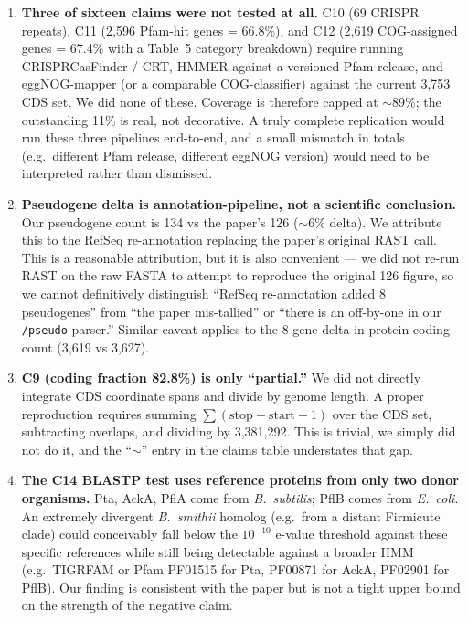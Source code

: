 \documentclass[11pt]{article}
\begin{document}
\begin{enumerate}

\item \textbf{Three of sixteen claims were not tested at all.}
C10 (69 CRISPR repeats), C11 (2{,}596 Pfam-hit genes = 66.8\%), and C12 (2{,}619 COG-assigned genes = 67.4\% with a Table~5 category breakdown) require running CRISPRCasFinder / CRT, HMMER against a versioned Pfam release, and eggNOG-mapper (or a comparable COG-classifier) against the current 3{,}753 CDS set. We did none of these. Coverage is therefore capped at $\sim$89\%; the outstanding 11\% is real, not decorative. A truly complete replication would run these three pipelines end-to-end, and a small mismatch in totals (e.g.\ different Pfam release, different eggNOG version) would need to be interpreted rather than dismissed.

\item \textbf{Pseudogene delta is annotation-pipeline, not a scientific conclusion.}
Our pseudogene count is 134 vs the paper's 126 ($\sim$6\% delta). We attribute this to the RefSeq re-annotation replacing the paper's original RAST call. This is a reasonable attribution, but it is also convenient --- we did not re-run RAST on the raw FASTA to attempt to reproduce the original 126 figure, so we cannot definitively distinguish ``RefSeq re-annotation added 8 pseudogenes'' from ``the paper mis-tallied'' or ``there is an off-by-one in our \texttt{/pseudo} parser.'' Similar caveat applies to the 8-gene delta in protein-coding count (3{,}619 vs 3{,}627).

\item \textbf{C9 (coding fraction 82.8\%) is only ``partial.''}
We did not directly integrate CDS coordinate spans and divide by genome length. A proper reproduction requires summing $\sum (\text{stop} - \text{start} + 1)$ over the CDS set, subtracting overlaps, and dividing by 3{,}381{,}292. This is trivial, we simply did not do it, and the ``$\sim$'' entry in the claims table understates that gap.

\item \textbf{The C14 BLASTP test uses reference proteins from only two donor organisms.}
Pta, AckA, PflA come from \textit{B.\ subtilis}; PflB comes from \textit{E.\ coli}. An extremely divergent \textit{B.\ smithii} homolog (e.g.\ from a distant Firmicute clade) could conceivably fall below the $10^{-10}$ e-value threshold against these specific references while still being detectable against a broader HMM (e.g.\ TIGRFAM or Pfam PF01515 for Pta, PF00871 for AckA, PF02901 for PflB). Our finding is consistent with the paper but is not a tight upper bound on the strength of the negative claim.


\end{enumerate}
\end{document}
